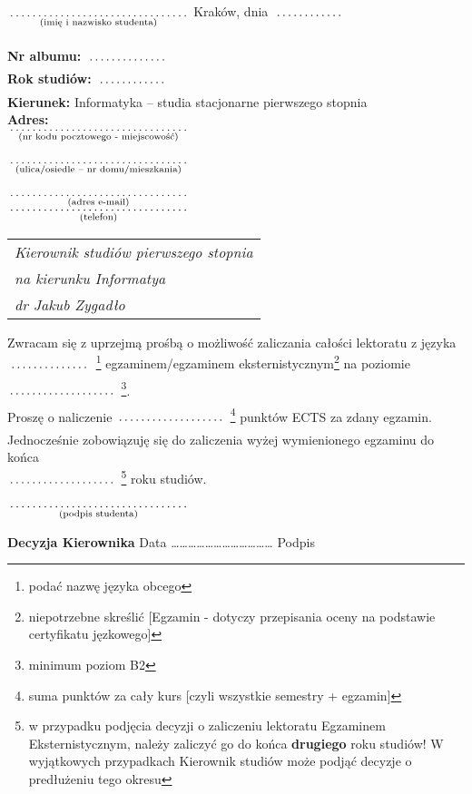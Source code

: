 \documentclass[a4paper,11pt]{article}
\newcommand{\fillField}[2]{
    $\underset{\text{#1}}{\parbox[t]{#2}{\dotfill}}$
}
\begin{document}
\noindent
\fillField{(imię i nazwisko studenta)}{5cm} \hfill Kraków, dnia \fillField{}{2cm} \\\\
\textbf{Nr albumu:}   \fillField{}{2.3cm}\\
\textbf{Rok studiów:} \fillField{}{2cm}\\
\textbf{Kierunek:} Informatyka -- studia stacjonarne pierwszego stopnia\\
\textbf{Adres:}\\
\fillField{(nr kodu pocztowego - miejscowość)}{5cm}\\\\
\fillField{(ulica/osiedle – nr domu/mieszkania)}{5cm}\\\\
\fillField{(adres e-mail)}{5cm}\\
\fillField{(telefon)}{5cm}
\phantom{a}\hfill
\begin{tabular}[c]{@{}l@{}}
\textit{Kierownik studiów pierwszego stopnia} \\
\textit{na kierunku Informatya}\\
\textit{dr Jakub Zygadło}
\end{tabular}

\vskip 2.0cm


\noindent
Zwracam się z uprzejmą prośbą o możliwość zaliczania całości
lektoratu z języka\fillField{}{2.3cm}\footnote{podać nazwę języka obcego} egzaminem/egzaminem eksternistycznym\footnote{niepotrzebne skreślić [Egzamin - dotyczy przepisania oceny na podstawie certyfikatu jęzkowego]}
na poziomie \fillField{}{3cm}\footnote{minimum poziom B2}. \\

\noindent
Proszę o naliczenie\fillField{}{3cm}\footnote{suma punktów za cały kurs [czyli wszystkie semestry + egzamin]} punktów ECTS za zdany egzamin.\\

\noindent
Jednocześnie zobowiązuję się do zaliczenia wyżej wymienionego egzaminu do końca\\\fillField{}{3cm}\footnote{w przypadku podjęcia decyzji o zaliczeniu lektoratu Egzaminem Eksternistycznym, należy zaliczyć go do końca \textbf{drugiego} roku studiów! W wyjątkowych przypadkach Kierownik studiów może podjąć decyzje o predłużeniu tego okresu} roku studiów.

\vskip 1cm

\hspace{\fill} \fillField{(podpis studenta)}{5cm} \hspace{2.0cm}
\vskip 3.0cm

\noindent
\textbf{Decyzja Kierownika} \dotfill
\vskip 0.5cm
\noindent
Data ……………………………… Podpis \dotfill
\end{document}
